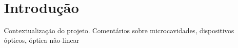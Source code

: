 \chapter{Introdução}
Contextualização do projeto. Comentários sobre microcavidades, dispositivos ópticos, óptica não-linear